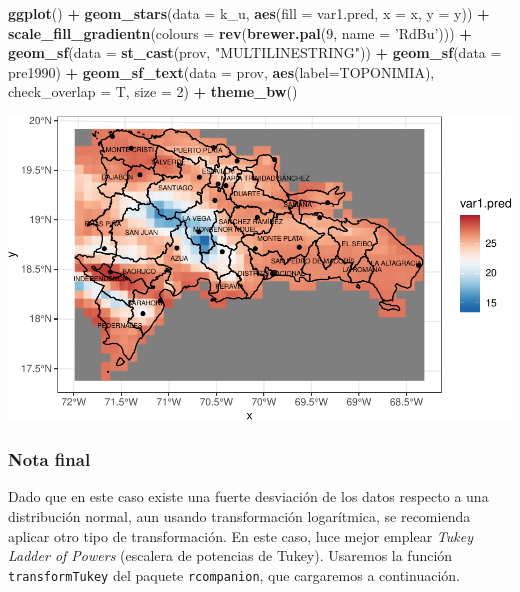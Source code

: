 \documentclass[11pt,]{article}
\newenvironment{Shaded}{\begin{snugshade}}{\end{snugshade}}
\newcommand{\KeywordTok}[1]{\textcolor[rgb]{0.13,0.29,0.53}{\textbf{#1}}}
\newcommand{\DataTypeTok}[1]{\textcolor[rgb]{0.13,0.29,0.53}{#1}}
\newcommand{\DecValTok}[1]{\textcolor[rgb]{0.00,0.00,0.81}{#1}}
\newcommand{\StringTok}[1]{\textcolor[rgb]{0.31,0.60,0.02}{#1}}
\newcommand{\OperatorTok}[1]{\textcolor[rgb]{0.81,0.36,0.00}{\textbf{#1}}}
\newcommand{\NormalTok}[1]{#1}
\begin{document}
\begin{Shaded}
\begin{Highlighting}[]
\KeywordTok{ggplot}\NormalTok{() }\OperatorTok{+}
\StringTok{  }\KeywordTok{geom_stars}\NormalTok{(}\DataTypeTok{data =}\NormalTok{ k_u, }\KeywordTok{aes}\NormalTok{(}\DataTypeTok{fill =}\NormalTok{ var1.pred, }\DataTypeTok{x =}\NormalTok{ x, }\DataTypeTok{y =}\NormalTok{ y)) }\OperatorTok{+}\StringTok{ }
\StringTok{  }\KeywordTok{scale_fill_gradientn}\NormalTok{(}\DataTypeTok{colours =} \KeywordTok{rev}\NormalTok{(}\KeywordTok{brewer.pal}\NormalTok{(}\DecValTok{9}\NormalTok{, }\DataTypeTok{name =} \StringTok{'RdBu'}\NormalTok{))) }\OperatorTok{+}
\StringTok{  }\KeywordTok{geom_sf}\NormalTok{(}\DataTypeTok{data =} \KeywordTok{st_cast}\NormalTok{(prov, }\StringTok{"MULTILINESTRING"}\NormalTok{)) }\OperatorTok{+}
\StringTok{  }\KeywordTok{geom_sf}\NormalTok{(}\DataTypeTok{data =}\NormalTok{ pre1990) }\OperatorTok{+}
\StringTok{  }\KeywordTok{geom_sf_text}\NormalTok{(}\DataTypeTok{data =}\NormalTok{ prov, }\KeywordTok{aes}\NormalTok{(}\DataTypeTok{label=}\NormalTok{TOPONIMIA), }\DataTypeTok{check_overlap =}\NormalTok{ T, }\DataTypeTok{size =} \DecValTok{2}\NormalTok{) }\OperatorTok{+}
\StringTok{  }\KeywordTok{theme_bw}\NormalTok{()}
\end{Highlighting}
\end{Shaded}

\includegraphics{Proyecto-Precipitaciones_files/figure-latex/krige-uk-1.pdf}

\subsubsection{Nota final}\label{nota-final}

Dado que en este caso existe una fuerte desviación de los datos respecto
a una distribución normal, aun usando transformación logarítmica, se
recomienda aplicar otro tipo de transformación. En este caso, luce mejor
emplear \emph{Tukey Ladder of Powers} (escalera de potencias de Tukey).
Usaremos la función \texttt{transformTukey} del paquete
\texttt{rcompanion}, que cargaremos a continuación.
\end{document}
